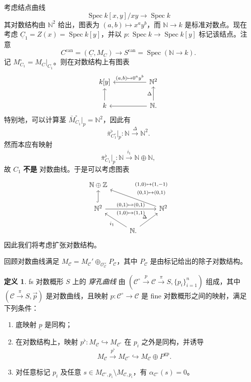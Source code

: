 \documentclass{amsart}
\theoremstyle{definition}
\newtheorem{defn}[thm]{定义}
\theoremstyle{remark}
\theoremstyle{plain}
\theoremstyle{definition}
\theoremstyle{remark}
\newcommand{\N}{\mathbb{N}}
\newcommand{\Z}{\mathbb{Z}}
\newcommand{\mc}[1]{\mathcal{#1}}
\newcommand{\mr}[1]{\mathrm{#1}}
\newcommand{\on}[1]{\operatorname{#1}}
\newcommand{\ul}[1]{\underline{#1}}
\newcommand{\1}{\mathbf{1}}
\newcommand{\2}{\mathbf{2}}
\newcommand{\3}{\mathbf{3}}
\DeclareMathOperator{\Spec}{Spec}
\begin{document}
考虑结点曲线
\[ \Spec k[x,y]/xy \to \Spec k \]
其对数结构由 \(\N^2\) 给出，图表为 \((a,b) \mapsto x^a y^b\)，而 \(\N \to k\) 是标准对数点。现在考虑 \(\ul{C}_1 = Z(x) = \Spec k[y]\)，并以 \(p \colon \Spec k \to \Spec k[y]\) 标记该结点。注意
\[ C^{\on{can}} = (\ul{C}, M_C) \to S^{\on{can}} = \Spec(\N \to k). \]
记 \(M_{C_1}^{\circ} = M_C|_{C_1}\)。则在对数结构上有图表
\begin{equation*}
\begin{tikzcd}
    k[y] & & \N^2 \ar{ll}[swap]{(a,b) \mapsto 0^a y^b} \\
    k \ar{u} & & \N \ar{ll} \ar{u}{\Delta}.
\end{tikzcd}
\end{equation*}
特别地，可以计算茎 \(\bar{M}_{C_1}^{\circ}|_p = \N^2\)，因此有
\[ \bar{\pi}_{C_1^{\circ}}^{\flat} |_p \colon \N \xrightarrow{\Delta} \N^2. \]
然而本应有映射
\[ \bar{\pi}^{\flat}_{C_1}|_p \colon \N \xrightarrow{i_1} \N \oplus \N, \]
故 \(C_1\) \textbf{不是} 对数曲线。于是可以考虑图表
\begin{equation*}
\begin{tikzcd}
    \N \oplus \Z \\
    \N^2 \ar[hookrightarrow]{u} \ar{rr}{(0,1)\mapsto (0,1)}[swap]{(1,0)\mapsto (1,1)} & & \N^2 \ar{ull}[swap]{\Vectorstack{{(1,0)\mapsto(1,-1)} {(0,1)\mapsto(0,1)}}} \\
    & \N \ar{ul}{i_1} \ar{ur}{\Delta}.
\end{tikzcd}
\end{equation*}
因此我们将考虑扩张对数结构。

回顾对数曲线满足 \(M_{\mc{C}} = M_{\mc{C}}' \oplus_{\mc{O}_{\mc{C}}^{\times}} P_{\mc{C}}\)，其中 \(P_{\mc{C}}\) 是由标记给出的除子对数结构。

\begin{defn}
    fs 对数概形 \(S\) 上的 \textit{穿孔曲线} 由 \((\mc{C}^{\circ} \xrightarrow{p} \mc{C} \xrightarrow{\pi} S, \{p_i\}_{i=1}^n)\) 组成，其中 \((\mc{C} \xrightarrow{\pi} S, \vec{p})\) 是对数曲线，且映射 \(p \colon \mc{C}^{\circ} \to \mc{C}\) 是 fine 对数概形之间的映射，满足下列条件：
    \begin{enumerate}
        \item 底映射 \(\ul{p}\) 是同构；
        \item 在对数结构上，映射 \(p^{\flat} \colon M_{\mc{C}} \hookrightarrow M_{\mc{C}^{\circ}}\) 在 \(p_i\) 之外是同构，并诱导
            \[ M_{\mc{C}} \xrightarrow{p^{\flat}} M_{\mc{C}^{\circ}} \hookrightarrow M_{\mc{C}} \oplus P^{\mr{gp}}. \]
        \item 对任意标记 \(p_i\) 及任意 \(s \in M_{\mc{C}^{\circ}, p_i} \setminus M_{\mc{C}, p_i}\)，有 \(\alpha_{\mc{C}^{\circ}}(s) = 0\)。
    \end{enumerate}
\end{defn}
\end{document}
